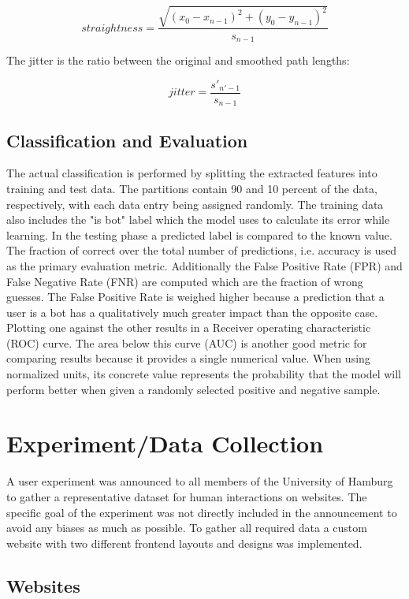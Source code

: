 \documentclass[
    fontsize=12pt,
    headings=small,
    parskip=half,           %
    bibliography=totoc,
    numbers=noenddot,       %
    open=any,               %
    final                   %
]{scrreprt}
\begin{document}
\[
straightness = \frac{ \sqrt{ (x_0 - x_{n-1})^2 + (y_0 - y_{n-1})^2 } }{s_{n-1}}
\]

The jitter is the ratio between the original and smoothed path lengths:

\[
jitter = \frac{s'_{n'-1}}{s_{n-1}}
\]



\subsection{Classification and Evaluation}

The actual classification is performed by splitting the extracted features into training and test data. The partitions contain 90 and 10 percent of the data, respectively, with each data entry being assigned randomly. The training data also includes the "is bot" label which the model uses to calculate its error while learning. In the testing phase a predicted label is compared to the known value. The fraction of correct over the total number of predictions, i.e. accuracy is used as the primary evaluation metric. Additionally the False Positive Rate (FPR) and False Negative Rate (FNR) are computed which are the fraction of wrong guesses. The False Positive Rate is weighed higher because a prediction that a user is a bot has a qualitatively much greater impact than the opposite case. Plotting one against the other results in a Receiver operating characteristic (ROC) curve. The area below this curve (AUC) is another good metric for comparing results because it provides a single numerical value. When using normalized units, its concrete value represents the probability that the model will perform better when given a randomly selected positive and negative sample.\cite{FAWCETT2006861}


\section{Experiment/Data Collection}

A user experiment was announced to all members of the University of Hamburg to gather a representative dataset for human interactions on websites. The specific goal of the experiment was not directly included in the announcement to avoid any biases as much as possible. To gather all required data a custom website with two different frontend layouts and designs was implemented.

\subsection{Websites}
\end{document}
